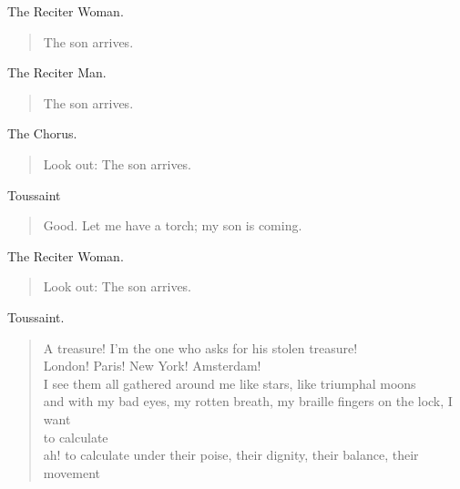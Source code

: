 \documentclass[letterpaper,article,12pt,oneside,notitlepage]{memoir}
\begin{document}
\begin{center}The Reciter Woman.\end{center}

\begin{verse}
The son arrives. \\
\end{verse}

\begin{center}The Reciter Man.\end{center}

\begin{verse}
The son arrives. \\
\end{verse}

\begin{center}The Chorus.\end{center}

\begin{verse}
Look out: The son arrives. \\
\end{verse}

\begin{center}Toussaint\end{center}

\begin{verse}
Good. Let me have a torch; my son is coming. \\
\end{verse}

\begin{center}The Reciter Woman.\end{center}

\begin{verse}
Look out: The son arrives. \\
\end{verse}

\begin{center}Toussaint.\end{center}

\begin{verse}
A treasure! I'm the one who asks for his stolen treasure! \\
London! Paris! New York! Amsterdam! \\
I see them all gathered around me like stars, like triumphal moons \\
and with my bad eyes, my rotten breath, my braille fingers on the lock, I want \\
to calculate \\
ah! to calculate under their poise, their dignity, their balance, their movement \\
\end{verse}
\end{document}
